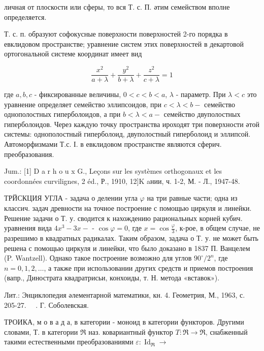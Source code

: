 \documentclass[10pt]{article}
\begin{document}
личная от плоскости или сферы, то вся Т. с. П. әтим семейством вполне определяется.



Т. с. п. образуют софокусные поверхности поверхностей 2-го порядка в евклидовом пространстве; уравнение систем этих поверхностей в декартовой ортогональной системе координат имеет вид



\[

\frac{x^{2}}{a+\lambda}+\frac{y^{2}}{b+\lambda}+\frac{z^{2}}{c+\lambda}=1

\]



где $a, b, c$ - фиксированные величины, $0<c<b<a$, $\lambda$ - параметр. При $\lambda<c$ это уравнение определяет семейство эллипсоидов, при $c<\lambda<b-$ семейство однополостных гиперболоидов, а при $b<\lambda<a-$ семейство двуполостных гиперболоидов. Через каждую точку пространства ироходят три поверхности әтой системы: однополостный гиперболоид, двуполостный гиперболоид и эллипсой. Автоморфизмами Т.с. І. в евклидовом пространстве являются сферич. преобразования.



Jum.: [1] D a r h o u x G., Leçons sur les systèmes orthogonaux et les coordonnées curvilignes, 2 éd., Р., 1910, 12$] \mathrm{K}$ aнии, ч. 1-2, М. - Л., 1947-48.



ТРЙСКЦИЯ УГЛА - задача о делении угла $\varphi$ на три равные части; одна из классич. задач древности на точное построение с помощью циркуля и линейки. Решение задачи о Т. у. сводится к нахождению рациональных корней кубич. уравнения вида $4 x^{3}-3 x-$ - $\cos \varphi=0$, где $x=\cos \frac{\varphi}{3}$, к-рое, в общем случае, не разрешимо в квадратных радикалах. Таким образом, задача о Т. у. не может быть решена с помощью циркуля и линейки, что было доказано в 1837 П. Ванцелем (P. Wantzell). Однако такое построение возможно для углов $90^{\circ} / 2^{n}$, где $n=0,1,2, \ldots$, а также при использовании других средств и приемов построения (вапр., Динострата квадратрисьи, конхоиды, т. Н. метода «вставок»).



Лит.: Энциклопедия әлементарной математики, кн. 4. Геометрия, М., 1963, с. 205-27. $\quad$. Г. Соболевская.



ТРОИКА, м о в а д а, в категории - моноид в категории функторов. Другими словами, Т. в категории $\mathfrak{R}$ наз. ковариантный функтор $T: \mathfrak{R} \rightarrow \mathfrak{R}$, снабженный такими естественными преобразованиями $\varepsilon: \operatorname{Id}_{\Re} \rightarrow$
\end{document}
